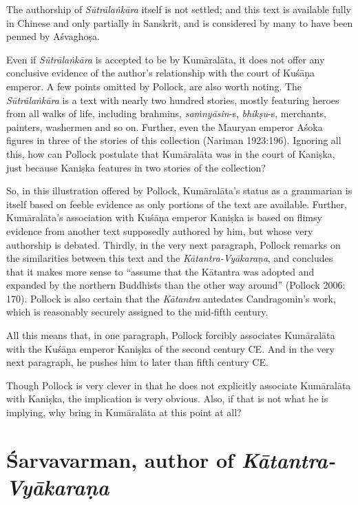 The authorship of {\sl Sūtrālaṅkāra} itself is not settled; and this text is available fully in Chinese and only partially in Sanskrit, and is considered by many to have been penned by Aśvaghoṣa.

Even if {\sl Sūtrālaṅkāra} is accepted to be by Kumāralāta, it does not offer any conclusive evidence of the author's relationship with the court of Kuśāṇa emperor. A few points omitted by Pollock, are also worth noting. The {\sl Sūtrālaṅkāra} is a text with nearly two hundred stories, mostly featuring heroes from all walks of life, including brahmins, {\sl saṁnyāsin}-s, {\sl bhikṣu}-s, merchants, painters, washermen and so on. Further, even the Mauryan emperor Aśoka figures in three of the stories of this collection (Nariman 1923:196). Ignoring all this, how can Pollock postulate that Kumāralāta was in the court of Kaniṣka, just because Kaniṣka features in two stories of the collection?

So, in this illustration offered by Pollock, Kumāralāta's status as a grammarian is itself based on feeble evidence as only portions of the text are available. Further, Kumāralāta's association with Kuśāṇa emperor Kaniṣka is based on flimsy evidence from another text supposedly authored by him, but whose very authorship is debated. Thirdly, in the very next paragraph, Pollock remarks on the similarities between this text and the {\sl Kātantra-Vyākaraṇa}, and concludes that it makes more sense to ``assume that the Kātantra was adopted and expanded by the northern Buddhists than the other way around'' (Pollock 2006: 170). Pollock is also certain that the {\sl Kātantra} antedates Candragomin's work, which is reasonably securely assigned to the mid-fifth century. 

All this means that, in one paragraph, Pollock forcibly associates Kumāralāta with the Kuśāṇa emperor Kaniṣka of the second century CE. And in the very next paragraph, he pushes him to later than fifth century CE. 

Though Pollock is very clever in that he does not explicitly associate Kumāralāta with Kaniṣka, the implication is very obvious. Also, if that is not what he is implying, why bring in Kumāralāta at this point at all?

\section{Śarvavarman, author of {\sl\bfseries Kātantra-\-Vyāka\-raṇa}}\label{chap3-sec11}

